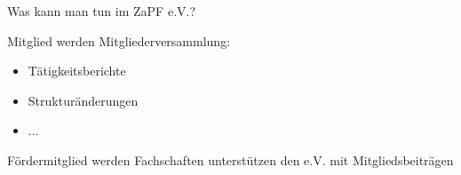 \documentclass[compress, aspectratio=169]{beamer}
\begin{document}
\thispagestyle{empty}
\begin{frame}{Was kann man tun im ZaPF e.V.?}
  \begin{block}{Mitglied werden}
    Mitgliederversammlung:
    \begin{itemize}
      \item Tätigkeitsberichte
      \item Strukturänderungen
      \item ...
    \end{itemize}
  \end{block}
\pause
  \begin{block}{Fördermitglied werden}
  Fachschaften unterstützen den e.V. mit Mitgliedsbeiträgen
  \end{block}
\end{frame}
\end{document}
